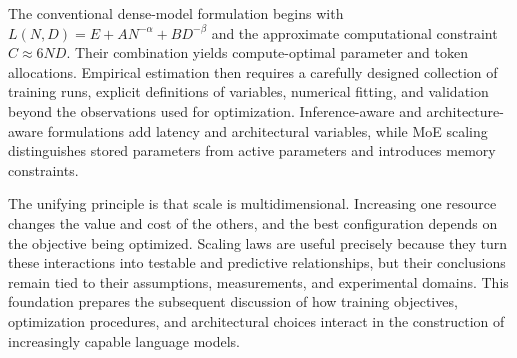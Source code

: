 The conventional dense-model formulation begins with
\(L(N,D)=E+AN^{-\alpha}+BD^{-\beta}\) and the approximate computational
constraint \(C\approx6ND\). Their combination yields compute-optimal
parameter and token allocations. Empirical estimation then requires a
carefully designed collection of training runs, explicit definitions of
variables, numerical fitting, and validation beyond the observations used
for optimization. Inference-aware and architecture-aware formulations add
latency and architectural variables, while MoE scaling distinguishes stored
parameters from active parameters and introduces memory constraints.

The unifying principle is that scale is multidimensional. Increasing one
resource changes the value and cost of the others, and the best configuration
depends on the objective being optimized. Scaling laws are useful precisely
because they turn these interactions into testable and predictive
relationships, but their conclusions remain tied to their assumptions,
measurements, and experimental domains. This foundation prepares the
subsequent discussion of how training objectives, optimization procedures,
and architectural choices interact in the construction of increasingly
capable language models.
